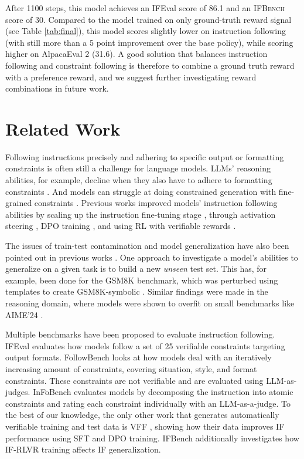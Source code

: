 \documentclass{article}
\newcommand{\benchname}{\textsc{IFBench}\xspace}
\begin{document}
After 1100 steps, this model achieves an IFEval score of 86.1 and an \benchname score of 30. Compared to the model trained on only ground-truth reward signal (see Table \ref{tab:final}), this model scores slightly lower on instruction following (with still more than a 5 point improvement over the base policy), while scoring higher on AlpacaEval 2 (31.6). A good solution that balances instruction following and constraint following is therefore to combine a ground truth reward with a preference reward, and we suggest further investigating reward combinations in future work.


\section{Related Work}
Following instructions precisely and adhering to specific output or formatting constraints is often still a challenge for language models. LLMs' reasoning abilities, for example, decline when they also have to adhere to formatting constraints \cite{tam2024let}. And models can struggle at doing constrained generation with fine-grained constraints \cite{sun2023evaluating}. Previous works improved models' instruction following abilities by scaling up the instruction fine-tuning stage \cite{chung2024scaling}, through activation steering \cite{stolfo2024improving}, DPO training \cite{kim-etal-2025-systematic}, and using RL with verifiable rewards \cite{lambert2024t}.


The issues of train-test contamination and model generalization have also been pointed out in previous works \cite{golchintime, roberts2023cutoff, dominguez2024training}. One approach to investigate a model's abilities to generalize on a given task is to build a new \textit{unseen} test set. This has, for example, been done for the GSM8K benchmark, which was perturbed using templates to create GSM8K-symbolic \cite{mirzadehgsm}. Similar findings were made in the reasoning domain, where models were shown to overfit on small benchmarks like AIME'24 \cite{Hochlehnert2025ASL}.


Multiple benchmarks have been proposed to evaluate instruction following. IFEval \cite{zhou2023instruction} evaluates how models follow a set of 25 verifiable constraints targeting output formats. FollowBench \cite{jiang2023followbench} looks at how models deal with an iteratively increasing amount of constraints, covering situation, style, and format constraints. These constraints are not verifiable and are evaluated using LLM-as-judges. InFoBench \cite{qin2024infobench} evaluates models by decomposing the instruction into atomic constraints and rating each constraint individually with an LLM-as-a-judge. To the best of our knowledge, the only other work that generates automatically verifiable training and test data is VFF \cite{wangverifiable}, showing how their data improves IF performance using SFT and DPO training. IFBench additionally investigates how IF-RLVR training affects IF generalization.
\end{document}
